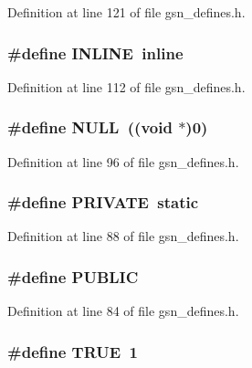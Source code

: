 Definition at line 121 of file gsn\_\-defines.h.

\hypertarget{a00481_a2eb6f9e0395b47b8d5e3eeae4fe0c116}{
\subsubsection[{INLINE}]{\setlength{\rightskip}{0pt plus 5cm}\#define INLINE~inline}}
\label{a00481_a2eb6f9e0395b47b8d5e3eeae4fe0c116}


Definition at line 112 of file gsn\_\-defines.h.

\hypertarget{a00481_a070d2ce7b6bb7e5c05602aa8c308d0c4}{
\subsubsection[{NULL}]{\setlength{\rightskip}{0pt plus 5cm}\#define NULL~((void $\ast$)0)}}
\label{a00481_a070d2ce7b6bb7e5c05602aa8c308d0c4}


Definition at line 96 of file gsn\_\-defines.h.

\hypertarget{a00481_a5e151c615eda34903514212f05a5ccf8}{
\subsubsection[{PRIVATE}]{\setlength{\rightskip}{0pt plus 5cm}\#define PRIVATE~static}}
\label{a00481_a5e151c615eda34903514212f05a5ccf8}


Definition at line 88 of file gsn\_\-defines.h.

\hypertarget{a00481_ad17d551e31d1828c68acf40684849b7e}{
\subsubsection[{PUBLIC}]{\setlength{\rightskip}{0pt plus 5cm}\#define PUBLIC}}
\label{a00481_ad17d551e31d1828c68acf40684849b7e}


Definition at line 84 of file gsn\_\-defines.h.

\hypertarget{a00481_aa8cecfc5c5c054d2875c03e77b7be15d}{
\subsubsection[{TRUE}]{\setlength{\rightskip}{0pt plus 5cm}\#define TRUE~1}}
\label{a00481_aa8cecfc5c5c054d2875c03e77b7be15d}


